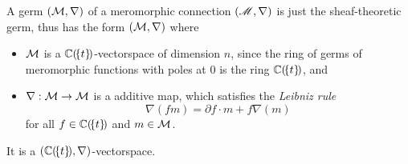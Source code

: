 \begin{comment}
  \begin{paracol}{2}\sloppy
  \switchcolumn[0]\noindent
    Let $U$ be a trivializing open set for $M$ and let
    $\textbf{e}=(e_1,\dots,e_n)$ be a basis of $\Gamma(U,\sM)$.
    There exists then a $n\times n$ matrix $A$ of meromorphic 1-forms such
    that\dots
    \begin{defn}
      This matrix is called \emph{connection matrix} for $(\sM,\nabla)$.
    \end{defn}
  \switchcolumn[1]\noindent
    Let $U$ be a neighbourhood of $0$ and $t$ a coordinate on $U$ vanishing at
    $0$.
  \end{paracol}
\end{comment}
\begin{comment}
  Some Literature like \cite{sabbah_cimpa90} always talks about germs\dots
\end{comment}
\begin{prop}
  A germ $(\mathcal{M},\nabla)$ of a meromorphic connection $(\mathscr{M},\nabla)$ is just the
  sheaf-theoretic germ, thus has the form $(\mathcal{M},\nabla)$ where
  \begin{itemize}
    \item $\mathcal{M}$ is a $\mathbb{C}(\!\{t\}\!)$-vectorspace of dimension $n$, since the
      ring of germs of meromorphic functions with poles at $0$ is the ring
      $\mathbb{C}(\!\{t\}\!)$, and
    \item $\nabla:\mathcal{M}\to \mathcal{M}$ is a additive map, which satisfies the
      \emph{Leibniz rule}
      \[
        \nabla(fm)=\partial f\cdot m + f\nabla(m)
      \]
      for all $f\in\mathbb{C}(\!\{t\}\!)$ and $m\in \mathcal{M}$.
  \end{itemize}
  \begin{rem}
    It is a $(\mathbb{C}(\!\{t\}\!),\nabla)$-vectorspace.
  \end{rem}
  \begin{comment}
    \begin{rem}
      Loday-Richaud calls this in \cite[Def.4.2.1]{Loday2014} a
      \emph{differential module}.
    \end{rem}
  \end{comment}
\end{prop}
